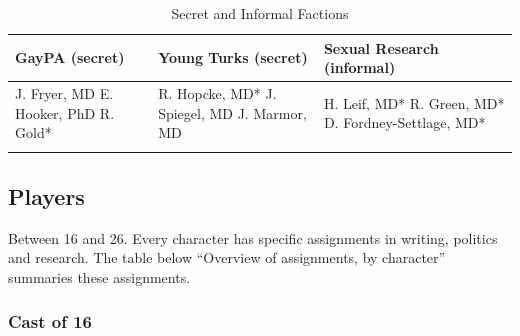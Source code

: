  \begin{longtable}[!t]{ | p{2cm} | p{2cm} | p{2cm} | }
\hline
GayPA (secret) & Young Turks (secret) & Sexual Research (informal)  \\ \hline
J. Fryer, MD\newline
E. Hooker, PhD\newline
R. Gold*
&
R. Hopcke, MD*\newline
J. Spiegel, MD\newline
J. Marmor, MD
&
H. Leif, MD*\newline
R. Green, MD*\newline
D. Fordney-Settlage, MD* \\
\caption{Secret and Informal Factions}
\label{table: secretfactions}
\end{longtable} 

\subsection{Players}
\label{players}

Between 16 and 26. Every character has specific assignments in writing, politics and research. The table below “Overview of assignments, by character” summaries these assignments. 

\subsubsection{Cast of 16}
\label{castof16}

